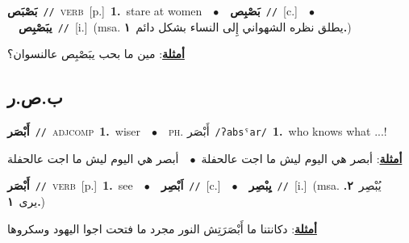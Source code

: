 \documentclass[10pt,a4paper,twoside]{article} %
\begin{document}
\begin{multicols}{2}
{\setlength\topsep{0pt}\textbf{\foreignlanguage{arabic}{بَصْبَص}}\ {\color{gray}\texttt{//}\color{black}}\ \textsc{verb}\ [p.]\ \textbf{1.}~stare at women\ \ $\bullet$\ \ \setlength\topsep{0pt}\textbf{\foreignlanguage{arabic}{بَصْبِص}}\ {\color{gray}\texttt{//}\color{black}}\ [c.]\ \ $\bullet$\ \ \setlength\topsep{0pt}\textbf{\foreignlanguage{arabic}{يبَصْبِص}}\ {\color{gray}\texttt{//}\color{black}}\ [i.]\ \color{gray}(msa. \foreignlanguage{arabic}{يطلق نظره الشهواني إِلى النساء بشكل دائم}~\foreignlanguage{arabic}{\textbf{١.}})\color{black}\  \begin{flushright}\color{gray}\foreignlanguage{arabic}{\textbf{\underline{\foreignlanguage{arabic}{أمثلة}}}: مين ما بحب يبَصْبِص عالنسوان؟}\end{flushright}\color{black}} \vspace{2mm}

\vspace{-3mm}
\subsection*{\color{blue}\foreignlanguage{arabic}{ب.ص.ر}\color{blue}{}} 

{\setlength\topsep{0pt}\textbf{\foreignlanguage{arabic}{أَبْصَر}}\ {\color{gray}\texttt{//}\color{black}}\ \textsc{adj\textunderscore comp}\ \textbf{1.}~wiser\ \ $\bullet$\ \ \textsc{ph.} \color{gray} \foreignlanguage{arabic}{أَبْصَر}\color{black}\ {\color{gray}\texttt{/{\sffamily ʔabsˤar}/}\color{black}}\ \textbf{1.}~who knows what ...!\  \begin{flushright}\color{gray}\foreignlanguage{arabic}{\textbf{\underline{\foreignlanguage{arabic}{أمثلة}}}: أبصر هي اليوم ليش ما اجت عالحفلة\ $\bullet$\ \  أبصر هي اليوم ليش ما اجت عالحفلة}\end{flushright}\color{black}} \vspace{2mm}

{\setlength\topsep{0pt}\textbf{\foreignlanguage{arabic}{أَبْصَر}}\ {\color{gray}\texttt{//}\color{black}}\ \textsc{verb}\ [p.]\ \textbf{1.}~see\ \ $\bullet$\ \ \setlength\topsep{0pt}\textbf{\foreignlanguage{arabic}{اَبْصِر}}\ {\color{gray}\texttt{//}\color{black}}\ [c.]\ \ $\bullet$\ \ \setlength\topsep{0pt}\textbf{\foreignlanguage{arabic}{يِبْصِر}}\ {\color{gray}\texttt{//}\color{black}}\ [i.]\ \color{gray}(msa. \foreignlanguage{arabic}{يُبْصِر}~\foreignlanguage{arabic}{\textbf{٢.}}  \foreignlanguage{arabic}{يرى}~\foreignlanguage{arabic}{\textbf{١.}})\color{black}\  \begin{flushright}\color{gray}\foreignlanguage{arabic}{\textbf{\underline{\foreignlanguage{arabic}{أمثلة}}}: دكانتنا ما أَبْصَرَتِش النور مجرد ما فتحت اجوا اليهود وسكروها}\end{flushright}\color{black}} \vspace{2mm}


\end{multicols}
\end{document}
